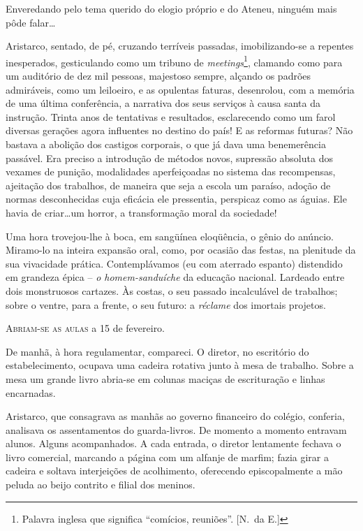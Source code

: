 Enveredando pelo tema
querido do elogio próprio e do Ateneu, ninguém mais pôde falar\ldots

Aristarco, sentado, de pé, cruzando terríveis passadas,
imobilizando{}-se a repentes inesperados, gesticulando como um tribuno
de \textit{meetings}\footnote{ Palavra inglesa que significa 
``comícios, reuniões''. [N.~da E.]}, clamando 
como para um auditório de dez mil pessoas,
majestoso sempre, alçando os padrões admiráveis, como um leiloeiro, e
as opulentas faturas, desenrolou, com a memória de uma última
conferência, a narrativa dos seus serviços à causa santa da instrução.
Trinta anos de tentativas e resultados, esclarecendo como um farol
diversas gerações agora influentes no destino do país! E as reformas
futuras? Não bastava a abolição dos castigos corporais, o que já dava
uma benemerência passável. Era preciso a introdução de métodos novos,
supressão absoluta dos vexames de punição, modalidades aperfeiçoadas no
sistema das recompensas, ajeitação dos trabalhos, de maneira que seja a
escola um paraíso, adoção de normas desconhecidas cuja eficácia ele
pressentia, perspicaz como as águias. Ele havia de criar\ldots um horror,
a transformação moral da sociedade! 

Uma hora trovejou{}-lhe à boca, em
sangüínea eloqüência, o gênio do anúncio. Miramo{}-lo na inteira
expansão oral, como, por ocasião das festas, na plenitude da sua
vivacidade prática. Contemplávamos (eu com aterrado espanto) distendido
em grandeza épica -- \textit{o homem{}-sanduíche} da educação nacional. Lardeado
entre dois monstruosos cartazes. Às costas, o seu passado incalculável
de trabalhos; sobre o ventre, para a frente, o seu futuro: a \textit{réclame}
dos imortais projetos.


\sectionitem

\noindent\textsc{Abriam{}-se as aulas} a 15 de fevereiro. 

De manhã, à hora regulamentar, compareci. 
O diretor, no escritório do estabelecimento, ocupava uma
cadeira rotativa junto à mesa de trabalho. Sobre a mesa um grande livro
abria{}-se em colunas maciças de escrituração e linhas encarnadas.

Aristarco, que consagrava as manhãs ao governo financeiro do colégio,
conferia, analisava os assentamentos do guarda{}-livros. De momento a
momento entravam alunos. Alguns acompanhados. A cada entrada, o diretor
lentamente fechava o livro comercial, marcando a página com um alfanje
de marfim; fazia girar a cadeira e soltava interjeições de acolhimento,
oferecendo episcopalmente a mão peluda ao beijo contrito e filial dos meninos. 

